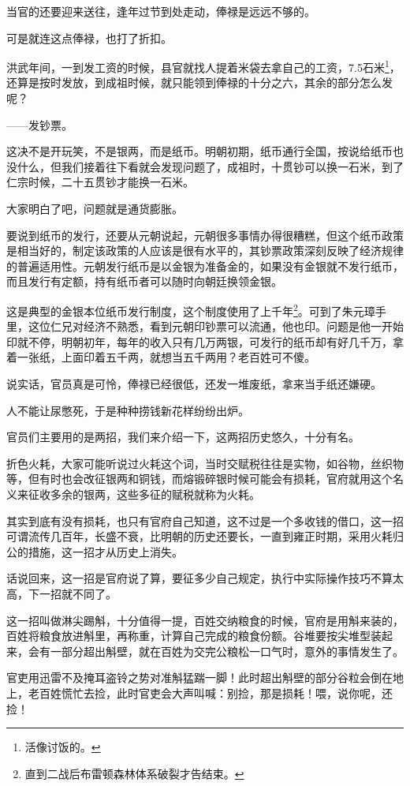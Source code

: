 \begin{multicols}{\theparacolNo}
		当官的还要迎来送往，逢年过节到处走动，俸禄是远远不够的。

		可是就连这点俸禄，也打了折扣。

		洪武年间，一到发工资的时候，县官就找人提着米袋去拿自己的工资，7.5石米\footnote{活像讨饭的。}，还算是按时发放，到成祖时候，就只能领到俸禄的十分之六，其余的部分怎么发呢？

		——发钞票。

		这决不是开玩笑，不是银两，而是纸币。明朝初期，纸币通行全国，按说给纸币也没什么，但我们接着往下看就会发现问题了，成祖时，十贯钞可以换一石米，到了仁宗时候，二十五贯钞才能换一石米。

		大家明白了吧，问题就是通货膨胀。

		要说到纸币的发行，还要从元朝说起，元朝很多事情办得很糟糕，但这个纸币政策是相当好的，制定该政策的人应该是很有水平的，其钞票政策深刻反映了经济规律的普遍适用性。元朝发行纸币是以金银为准备金的，如果没有金银就不发行纸币，而且发行有定额，持有纸币者可以随时向朝廷换领金银。

		这是典型的金银本位纸币发行制度，这个制度使用了上千年\footnote{直到二战后布雷顿森林体系破裂才告结束。}。可到了朱元璋手里，这位仁兄对经济不熟悉，看到元朝印钞票可以流通，他也印。问题是他一开始印就不停，明朝初年，每年的收入只有几万两银，可发行的纸币却有好几千万，拿着一张纸，上面印着五千两，就想当五千两用？老百姓可不傻。

		说实话，官员真是可怜，俸禄已经很低，还发一堆废纸，拿来当手纸还嫌硬。

		人不能让尿憋死，于是种种捞钱新花样纷纷出炉。

		官员们主要用的是两招，我们来介绍一下，这两招历史悠久，十分有名。

		折色火耗，大家可能听说过火耗这个词，当时交赋税往往是实物，如谷物，丝织物等，但有时也会改征银两和铜钱，而熔锻碎银时候可能会有损耗，官府就用这个名义来征收多余的银两，这些多征的赋税就称为火耗。

		其实到底有没有损耗，也只有官府自己知道，这不过是一个多收钱的借口，这一招可谓流传几百年，长盛不衰，比明朝的历史还要长，一直到雍正时期，采用火耗归公的措施，这一招才从历史上消失。

		话说回来，这一招是官府说了算，要征多少自己规定，执行中实际操作技巧不算太高，下一招就不同了。

		这一招叫做淋尖踢斛，十分值得一提，百姓交纳粮食的时候，官府是用斛来装的，百姓将粮食放进斛里，再称重，计算自己完成的粮食份额。谷堆要按尖堆型装起来，会有一部分超出斛壁，就在百姓为交完公粮松一口气时，意外的事情发生了。

		官吏用迅雷不及掩耳盗铃之势对准斛猛踹一脚！此时超出斛壁的部分谷粒会倒在地上，老百姓慌忙去捡，此时官吏会大声叫喊：别捡，那是损耗！喂，说你呢，还捡！


\end{multicols}
